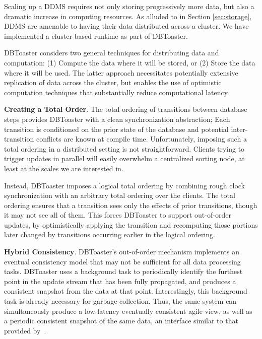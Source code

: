 Scaling up a DDMS requires not only storing progressively more data, but also a
dramatic increase in computing resources.  As alluded to in Section
\ref{sec:storage}, DDMS are amenable to having their data distributed across a
cluster.  We have implemented a cluster-based runtime as part of DBToaster.


DBToaster considers two general techniques for distributing data and
computation: (1) Compute the data where it will be stored, or (2) Store the data
where it will be used.  The latter approach necessitates potentially extensive
replication of data across the cluster, but enables the use of optimistic
computation techniques that substantially reduce computational latency.

\medspace 

{\bf Creating a Total Order}\/.
The total ordering of transitions between database steps provides DBToaster with
a clean synchronization abstraction; Each transition is conditioned on the prior
state of the database and potential inter-transition conflicts are known at
compile time.  Unfortunately, imposing such a total ordering in a distributed
setting is not straightforward.  Clients trying to trigger updates in parallel
will easily overwhelm a centralized sorting node, at least at the scales we are
interested in.

Instead, DBToaster imposes a logical total ordering by combining rough clock
synchronization with an arbitrary total ordering over the clients.  The total
ordering ensures that a transition sees only the effects of prior transitions,
though it may not see all of them.  This forces DBToaster to support
out-of-order updates, by optimistically applying the transition and recomputing
those portions later changed by transitions occurring earlier in the logical
ordering.

\medspace

{\bf Hybrid Consistency}\/.
DBToaster's out-of-order mechanism implements an eventual consistency model that
may not be sufficient for all data processing tasks.  DBToaster uses a
background task to periodically identify the furthest point in the update stream
that has been fully propagated, and produces a consistent snapshot from the data
at that point.  Interestingly, this background task is already necessary for
garbage collection.  Thus, the same system can simultaneously produce a
low-latency eventually consistent agile view, as well as a periodic consistent
snapshot of the same data, an interface similar to that provided
by~\cite{bayou}.

